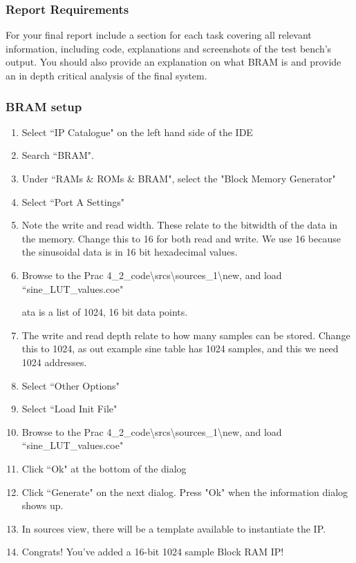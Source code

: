 \subsubsection{Report Requirements}
For your final report include a section for each task covering all relevant information, including code, explanations and screenshots of the test bench's output. You should also provide an explanation on what BRAM is and provide an in depth critical analysis of the final system. 

\subsubsection{BRAM setup}
\begin{enumerate}
    \item Select ``IP Catalogue" on the left hand side of the IDE
    \item Search ``BRAM".
    \item Under ``RAMs \& ROMs \& BRAM", select the "Block Memory Generator"
    \item Select ``Port A Settings"
    \item Note the write and read width. These relate to the bitwidth of the data in the memory. Change this to 16 for both read and write. We use 16 because the sinusoidal data is in 16 bit hexadecimal values.
    \item Browse to the Prac 4\_2\_code\textbackslash srcs\textbackslash sources\_1\textbackslash new, and load ``sine\_LUT\_values.coe"

ata is a list of 1024, 16 bit data points.
    \item The write and read depth relate to how many samples can be stored. Change this to 1024, as out example sine table has 1024 samples, and this we need 1024 addresses.
    \item Select ``Other Options"
    \item Select ``Load Init File"
    \item Browse to the Prac 4\_2\_code\textbackslash srcs\textbackslash sources\_1\textbackslash new, and load ``sine\_LUT\_values.coe"
    \item Click ``Ok" at the bottom of the dialog
    \item Click ``Generate" on the next dialog. Press "Ok" when the information dialog shows up.
    \item In sources view, there will be a template available to instantiate the IP.
    \item Congrats! You've added a 16-bit 1024 sample Block RAM IP!
\end{enumerate}


